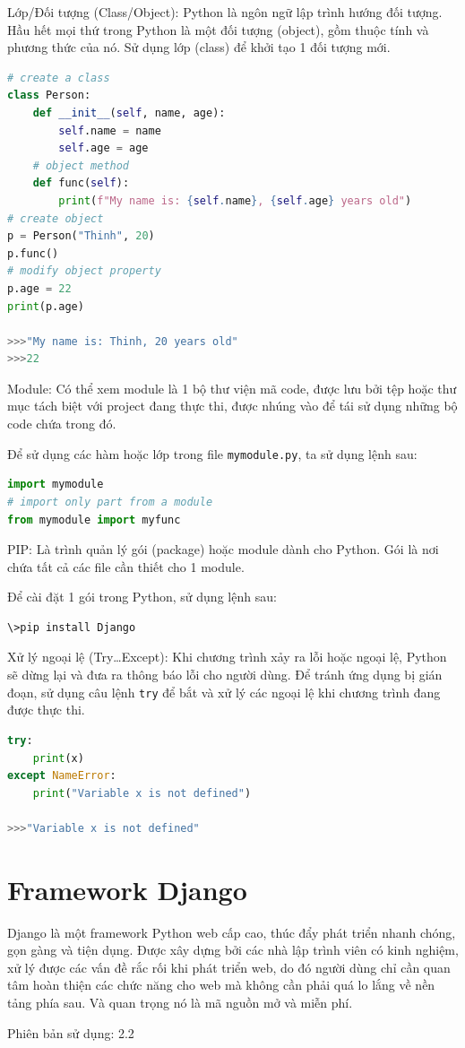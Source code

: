\par
Lớp/Đối tượng (Class/Object): Python là ngôn ngữ lập trình hướng đối tượng. Hầu hết mọi thứ trong Python là một đối tượng (object), gồm thuộc tính và phương thức của nó. Sử dụng lớp (class) để khởi tạo 1 đối tượng mới.
\begin{lstlisting}[language=Python]
# create a class
class Person:
	def __init__(self, name, age):
		self.name = name
		self.age = age
	# object method
	def func(self):
		print(f"My name is: {self.name}, {self.age} years old")
# create object
p = Person("Thinh", 20)
p.func()
# modify object property
p.age = 22
print(p.age)

>>>"My name is: Thinh, 20 years old"
>>>22
\end{lstlisting}
\par
Module: Có thể xem module là 1 bộ thư viện mã code, được lưu bởi tệp hoặc thư mục tách biệt với project đang thực thi, được nhúng vào để tái sử dụng những bộ code chứa trong đó.
\par
Để sử dụng các hàm hoặc lớp trong file \texttt{mymodule.py}, ta sử dụng lệnh sau:
\begin{lstlisting}[language=Python]
import mymodule
# import only part from a module
from mymodule import myfunc
\end{lstlisting}
\par
PIP: Là trình quản lý gói (package) hoặc module dành cho Python. Gói là nơi chứa tất cả các file cần thiết cho 1 module.
\par
Để cài đặt 1 gói trong Python, sử dụng lệnh sau:
\begin{lstlisting}[language=bash]
\>pip install Django
\end{lstlisting}
\par
Xử lý ngoại lệ (Try\ldots Except): Khi chương trình xảy ra lỗi hoặc ngoại lệ, Python sẽ dừng lại và đưa ra thông báo lỗi cho người dùng. Để tránh ứng dụng bị gián đoạn, sử dụng câu lệnh \texttt{try} để bắt và xử lý các ngoại lệ khi chương trình đang được thực thi.
\begin{lstlisting}[language=Python]
try:
	print(x)
except NameError:
	print("Variable x is not defined")
	
>>>"Variable x is not defined"
\end{lstlisting}
\section{Framework Django}
Django là một framework Python web cấp cao, thúc đẩy phát triển nhanh chóng, gọn gàng và tiện dụng. Được xây dựng bởi các nhà lập trình viên có kinh nghiệm, xử lý được các vấn đề rắc rối khi phát triển web, do đó người dùng chỉ cần quan tâm hoàn thiện các chức năng cho web mà không cần phải quá lo lắng về nền tảng phía sau. Và quan trọng nó là mã nguồn mở và miễn phí\cite{django}.
\par
Phiên bản sử dụng: 2.2
